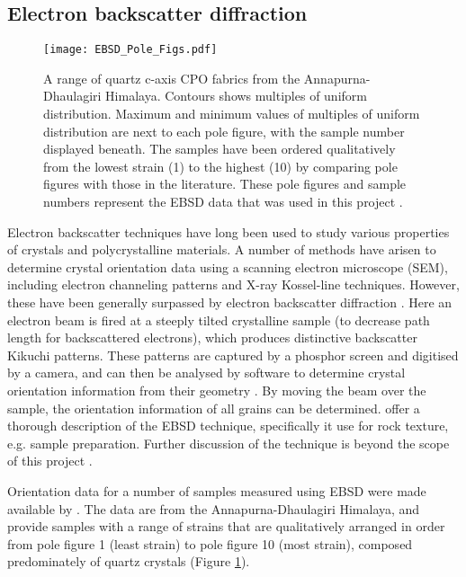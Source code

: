 \documentclass[a4paper,12pt,twoside]{report}
\numberwithin{equation}{chapter}
\begin{document}
\subsection{Electron backscatter diffraction}

\begin{figure}[h!]
  \centering
    \texttt{[image: EBSD\_Pole\_Figs.pdf]}
  \caption[EBSD data (pole figures)]{A range of quartz c-axis CPO fabrics from the Annapurna-Dhaulagiri Himalaya. Contours shows multiples of uniform distribution. Maximum and minimum values of multiples of uniform distribution are next to each pole figure, with the sample number displayed beneath. The samples have been ordered qualitatively from the lowest strain (1) to the highest (10) by comparing pole figures with those in the literature. These pole figures and sample numbers represent the EBSD data that was used in this project \citep[made available from][]{ParsonsThesis}.}
  \label{fig:EBSD_data}
\end{figure}  
    
    
Electron backscatter techniques have long been used to study various properties of crystals and polycrystalline materials. A number of methods have arisen to determine crystal orientation data using a scanning electron microscope (SEM), including electron channeling patterns and X-ray Kossel-line techniques. However, these have been generally surpassed by electron backscatter diffraction \citep[EBSD or backscatter Kikuchi diffraction,][]{Harland1973}.  Here an electron beam is fired at a steeply tilted crystalline sample (to decrease path length for backscattered electrons), which produces distinctive backscatter Kikuchi patterns. These patterns are captured by a phosphor screen and digitised by a camera, and can then be analysed by software to determine crystal orientation information from their geometry  \citep{Zaefferer2007}. By moving the beam over the sample, the orientation information of all grains can be determined. \cite{Prior1999} offer a thorough description of the EBSD technique, specifically it use for rock texture, e.g. sample preparation. Further discussion of the technique is beyond the scope of this project \citep[see][for more info]{Schwarzer1997,Randle2000}.    

Orientation data for a number of samples measured using EBSD were made available by \cite{ParsonsThesis}. The data are from the Annapurna-Dhaulagiri Himalaya, and provide samples with a range of strains that are qualitatively arranged in order from pole figure 1 (least strain) to pole figure 10 (most strain), composed predominately of quartz crystals (Figure \ref{fig:EBSD_data}). 
\end{document}
